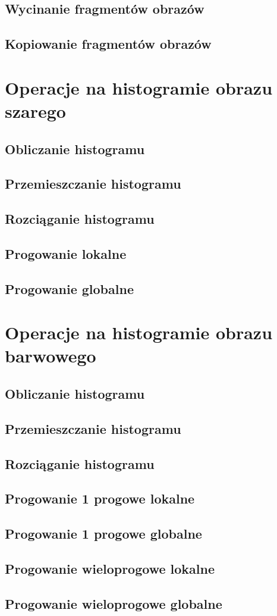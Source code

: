 \documentclass[a4paper,12pt, titlepage]{report}
\begin{document}
\section{Wycinanie fragmentów obrazów}
\section{Kopiowanie fragmentów obrazów}

\chapter{Operacje na histogramie obrazu szarego}
\section{Obliczanie histogramu}
\section{Przemieszczanie histogramu}
\section{Rozciąganie histogramu}
\section{Progowanie lokalne}
\section{Progowanie globalne}

\chapter{Operacje na histogramie obrazu barwowego}
\section{Obliczanie histogramu}
\section{Przemieszczanie histogramu}
\section{Rozciąganie histogramu}
\section{Progowanie 1 progowe lokalne}
\section{Progowanie 1 progowe globalne}
\section{Progowanie wieloprogowe lokalne}
\section{Progowanie wieloprogowe globalne}
\end{document}
